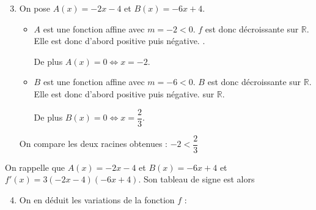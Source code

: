 \documentclass[15pt, mathserif]{beamer}
\begin{document}
 \begin{frame} 
 
 \begin{enumerate} 
 \setcounter{enumi}{2} 
 
 	 \item On pose $A(x)= -2x-4$ et $B(x) = -6x+4$.
 \bigskip 
 \begin{itemize}
	\item $A$ est une fonction affine avec $m =-2<0$. $f$ est donc décroissante sur $\mathbb{R}$. Elle est donc d'abord positive puis négative. .

	 De plus $A(x) = 0 \Leftrightarrow x = -2$. 
 \bigskip 
	\item $B$ est une fonction affine avec $m =-6<0$. $B$ est donc décroissante sur $\mathbb{R}$. Elle est donc d'abord positive puis négative. sur $\mathbb{R}$.

	 De plus $B(x) = 0 \Leftrightarrow x = \dfrac{2}{3}$.
\end{itemize}
 On compare les deux racines obtenues : $ -2 < \dfrac{2}{3}$ 
 \end{enumerate} 
 
 \end{frame}


\begin{frame}On rappelle que $A(x) = -2x-4$ et $B(x) = -6x+4$ et $f'(x) = 3(-2x-4)(-6x+4)$. Son tableau de signe est alors 

\medskip \hfil
{}

 \begin{enumerate} 
 \setcounter{enumi}{3} 
 	 \item On en déduit les variations de la fonction $f$ : 

  \medskip \hfil
{}

 \end{enumerate} 
 
\end{frame}
\end{document}
